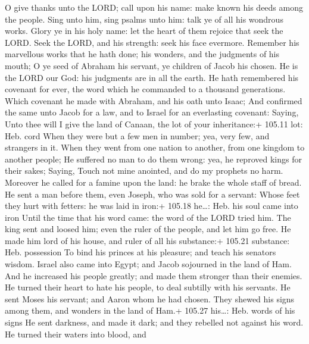  O give thanks unto the LORD; call upon his name: make known
his deeds among the people.  Sing unto him, sing psalms unto
him: talk ye of all his wondrous works.  Glory ye in his
holy name: let the heart of them rejoice that seek the LORD.
 Seek the LORD, and his strength: seek his face evermore.
 Remember his marvellous works that he hath done; his
wonders, and the judgments of his mouth;  O ye seed of
Abraham his servant, ye children of Jacob his chosen.  He is
the LORD our God: his judgments are in all the earth.  He
hath remembered his covenant for ever, the word which he commanded to a
thousand generations.  Which covenant he made with Abraham,
and his oath unto Isaac;  And confirmed the same unto Jacob
for a law, and to Israel for an everlasting covenant: 
Saying, Unto thee will I give the land of Canaan, the lot of your
inheritance:+ 105.11 lot: Heb. cord  When they were but a
few men in number; yea, very few, and strangers in it. 
When they went from one nation to another, from one kingdom to another
people;  He suffered no man to do them wrong: yea, he
reproved kings for their sakes;  Saying, Touch not mine
anointed, and do my prophets no harm.  Moreover he called
for a famine upon the land: he brake the whole staff of bread.
 He sent a man before them, even Joseph, who was sold for a
servant:  Whose feet they hurt with fetters: he was laid in
iron:+ 105.18 he\ldots: Heb. his soul came into iron  Until
the time that his word came: the word of the LORD tried him.
 The king sent and loosed him; even the ruler of the
people, and let him go free.  He made him lord of his
house, and ruler of all his substance:+ 105.21 substance: Heb.
possession  To bind his princes at his pleasure; and teach
his senators wisdom.  Israel also came into Egypt; and
Jacob sojourned in the land of Ham.  And he increased his
people greatly; and made them stronger than their enemies. 
He turned their heart to hate his people, to deal subtilly with his
servants.  He sent Moses his servant; and Aaron whom he had
chosen.  They shewed his signs among them, and wonders in
the land of Ham.+ 105.27 his\ldots: Heb. words of his signs
 He sent darkness, and made it dark; and they rebelled not
against his word.  He turned their waters into blood, and
